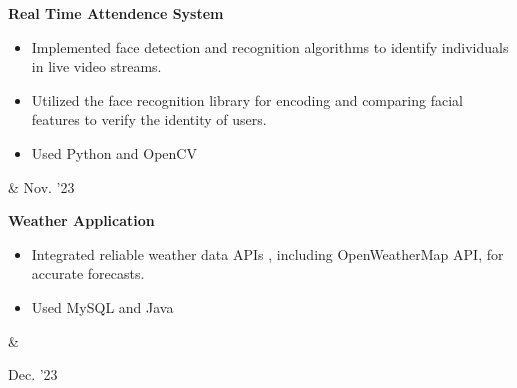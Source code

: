 \documentclass[10pt, letterpaper]{article}
\newenvironment{highlights}{
        \begin{itemize}[
                topsep=0pt,
                parsep=0.10 cm,
                partopsep=0pt,
                itemsep=0pt,
                after=\vspace{-1\baselineskip},
                leftmargin=0.4 cm + 3pt
            ]
    }{
        \end{itemize}
    } %
\let\originalTabularx\tabularx
\let\originalEndTabularx\endtabularx
\renewenvironment{tabularx}{\bgroup\centering\originalTabularx}{\originalEndTabularx\par\egroup}
\begin{document}
        
        
        \begin{tabularx}{
            \textwidth-0.4 cm-0.13cm
        }{
            K{0.2 cm}
            R{4.1 cm}
        }
            \textbf{Real Time Attendence System}

            \vspace{0.10 cm}

            \begin{highlights}
                \item  
                    Implemented face detection and recognition algorithms to identify individuals in live video streams.
                \item 
                Utilized the face recognition library for encoding and comparing facial features to verify the identity of users.
                \item  
                    Used Python and OpenCV 
               
            \end{highlights}
            &
            Nov.  '23
        \end{tabularx}

        \vspace{0.2 cm}
        
        
        \begin{tabularx}{
            \textwidth-0.4 cm-0.13cm
        }{
            K{0.2 cm}
            R{4.1 cm}
        }
            \textbf{Weather Application}

            \vspace{0.10 cm}

            \begin{highlights}
                \item 
                    Integrated reliable weather data APIs , including OpenWeatherMap API, for accurate forecasts.

                \item Used  MySQL and Java 
            \end{highlights}
            &
            

            Dec.  '23
        \end{tabularx}
        
        
        \vspace{0.2 cm}
        
    
\end{document}
